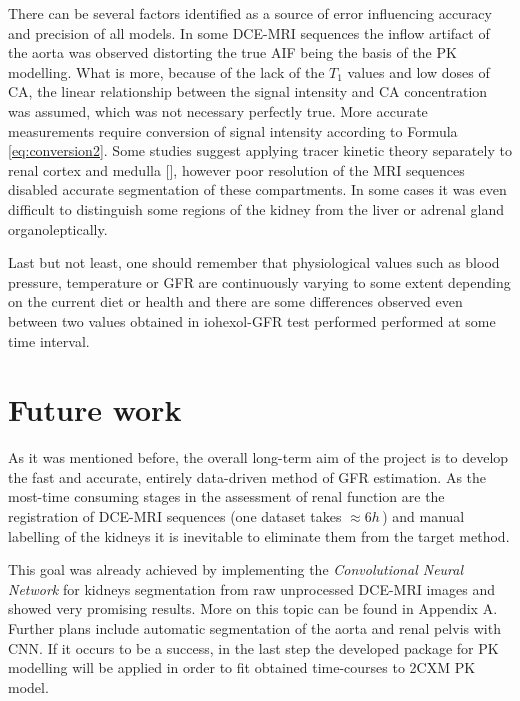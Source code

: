 There can be several factors identified as a source of error influencing accuracy and precision of all models. In some DCE-MRI sequences the inflow artifact of the aorta was observed distorting the true AIF being the basis of the PK modelling.   
What is more, because of the lack of the $T_1$ values and low doses of CA, the linear relationship between the signal intensity and CA concentration was assumed, which was not necessary perfectly true. More accurate measurements require conversion of signal intensity according to Formula \ref{eq:conversion2}.  
Some studies suggest applying tracer kinetic theory separately to renal cortex and medulla [], however poor resolution of the MRI sequences disabled accurate segmentation of these compartments. In some cases it was even difficult to distinguish some regions of the kidney from the liver or adrenal gland organoleptically.   

Last but not least, one should remember that physiological values such as blood pressure, temperature or GFR are continuously varying to some extent depending on the current diet or health and there are some differences observed even between two values obtained in iohexol-GFR test performed performed at some time interval.

\section{Future work}
As it was mentioned before, the overall long-term aim of the project is to develop the fast and accurate, entirely data-driven method of GFR estimation. As the most-time consuming stages in the assessment of renal function are the registration of DCE-MRI sequences (one dataset takes $\approx 6h\,$) and manual labelling of the kidneys it is inevitable to eliminate them from the target method.  

This goal was already achieved by implementing the \textit{Convolutional Neural Network} for kidneys segmentation from raw unprocessed DCE-MRI images  and showed very promising results. 
More on this topic can be found in Appendix A. Further plans include automatic segmentation of the aorta and renal pelvis with CNN. If it occurs to be a success, in the last step the developed package for PK modelling will be applied in order to fit obtained time-courses to 2CXM PK model.